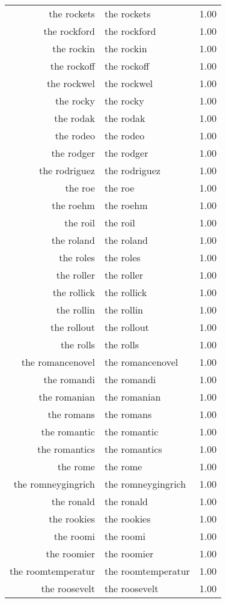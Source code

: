 \begin{table}[ht]
\begin{tabular}{rlr}
  the rockets & the rockets & 1.00 \\ 
  the rockford & the rockford & 1.00 \\ 
  the rockin & the rockin & 1.00 \\ 
  the rockoff & the rockoff & 1.00 \\ 
  the rockwel & the rockwel & 1.00 \\ 
  the rocky & the rocky & 1.00 \\ 
  the rodak & the rodak & 1.00 \\ 
  the rodeo & the rodeo & 1.00 \\ 
  the rodger & the rodger & 1.00 \\ 
  the rodriguez & the rodriguez & 1.00 \\ 
  the roe & the roe & 1.00 \\ 
  the roehm & the roehm & 1.00 \\ 
  the roil & the roil & 1.00 \\ 
  the roland & the roland & 1.00 \\ 
  the roles & the roles & 1.00 \\ 
  the roller & the roller & 1.00 \\ 
  the rollick & the rollick & 1.00 \\ 
  the rollin & the rollin & 1.00 \\ 
  the rollout & the rollout & 1.00 \\ 
  the rolls & the rolls & 1.00 \\ 
  the romancenovel & the romancenovel & 1.00 \\ 
  the romandi & the romandi & 1.00 \\ 
  the romanian & the romanian & 1.00 \\ 
  the romans & the romans & 1.00 \\ 
  the romantic & the romantic & 1.00 \\ 
  the romantics & the romantics & 1.00 \\ 
  the rome & the rome & 1.00 \\ 
  the romneygingrich & the romneygingrich & 1.00 \\ 
  the ronald & the ronald & 1.00 \\ 
  the rookies & the rookies & 1.00 \\ 
  the roomi & the roomi & 1.00 \\ 
  the roomier & the roomier & 1.00 \\ 
  the roomtemperatur & the roomtemperatur & 1.00 \\ 
  the roosevelt & the roosevelt & 1.00 \\ 

\end{tabular}
\end{table}
